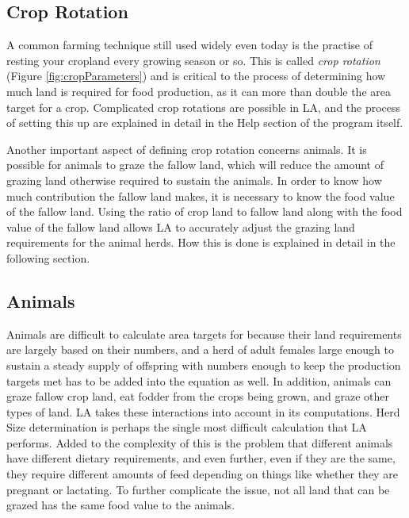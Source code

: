   \subsection{Crop Rotation}
  \label{cropRotation}
    A common farming technique still used widely even today is the practise of
    resting your cropland every growing season or so.  This is called
    \textit{crop rotation} (Figure \ref{fig:cropParameters}) and is critical
    to the process of determining how much land is required for food production,
    as it can more than double the area target for a crop.  Complicated crop 
    rotations are possible in LA, and the process of setting this up are
    explained in detail in the Help section of the program itself.
  
    Another important aspect of defining crop rotation concerns animals.  It is
    possible for animals to graze the fallow land, which will reduce the amount
    of grazing land otherwise required to sustain the animals.  In order to
    know how much contribution the fallow land makes, it is necessary to know
    the food value of the fallow land.  Using the ratio of crop land to fallow
    land along with the food value of the fallow land allows LA to
    accurately adjust the grazing land requirements for the animal herds.  How
    this is done is explained in detail in the following section.

  \subsection{Animals}
    Animals are difficult to calculate area targets for because their land
    requirements are largely based on their numbers, and a herd of adult
    females large enough to sustain a steady supply of offspring with numbers
    enough to keep the production targets met has to be added into the equation
    as well.  In addition, animals can graze fallow crop land, eat fodder from
    the crops being grown, and graze other types of land.  LA takes these
    interactions into account in its computations.
    Herd Size determination is perhaps the single most difficult calculation
    that LA performs.  Added to the complexity of this is the problem that different
    animals have different dietary requirements, and even further, even if they
    are the same, they require different amounts of feed depending on things
    like whether they are pregnant or lactating.  To further complicate the issue,
    not all land that can be grazed has the same food value to the animals.
    
